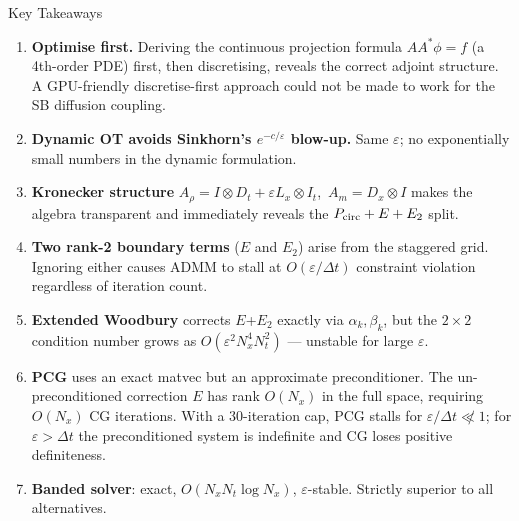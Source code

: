 \documentclass[10pt,aspectratio=169]{beamer}
\newcommand{\eps}{\varepsilon}
\newcommand{\Dt}{D_t}
\newcommand{\It}{I_t}
\newcommand{\Dx}{D_x}
\newcommand{\Lx}{L_x}
\newcommand{\kron}{\otimes}
\begin{document}
\begin{frame}{Key Takeaways}
  \begin{enumerate}
    \setlength\itemsep{5pt}
    \item \textbf{Optimise first.}
          Deriving the continuous projection formula $AA^*\phi=f$
          (a 4th-order PDE) first, then discretising, reveals the correct
          adjoint structure.  A GPU-friendly discretise-first approach could
          not be made to work for the SB diffusion coupling.

    \item \textbf{Dynamic OT avoids Sinkhorn's $e^{-c/\eps}$ blow-up.}
          Same $\eps$; no exponentially small numbers in the dynamic formulation.

    \item \textbf{Kronecker structure}
          $A_\rho = I\kron\Dt + \eps\Lx\kron\It$,\ $A_m = \Dx\kron I$
          makes the algebra transparent and immediately reveals the $P_{\rm circ}+E+E_2$ split.

    \item \textbf{Two rank-2 boundary terms} ($E$ and $E_2$) arise from
          the staggered grid.  Ignoring either causes ADMM to stall at
          $O(\eps/\Delta t)$ constraint violation regardless of iteration count.

    \item \textbf{Extended Woodbury} corrects $E$+$E_2$ exactly via
          $\alpha_k,\beta_k$, but the $2{\times}2$ condition number grows as
          $O(\eps^2 N_x^4 N_t^2)$ — unstable for large $\eps$.

    \item \textbf{PCG} uses an exact matvec but an approximate preconditioner.
          The un-preconditioned correction $E$ has rank $O(N_x)$ in the full
          space, requiring $O(N_x)$ CG iterations.  With a 30-iteration cap,
          PCG stalls for $\eps/\Delta t \not\ll 1$; for $\eps>\Delta t$ the
          preconditioned system is indefinite and CG loses positive definiteness.

    \item \textbf{Banded solver}: exact, $O(N_xN_t\log N_x)$, $\eps$-stable.
          Strictly superior to all alternatives.
  \end{enumerate}
\end{frame}
\end{document}
